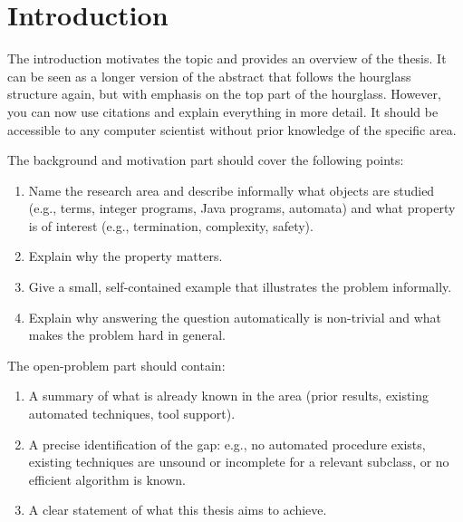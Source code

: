 \chapter{Introduction}

The introduction motivates the topic and provides an overview of the thesis.
It can be seen as a longer version of the abstract that follows the hourglass 
structure again, but with emphasis on the top part of the hourglass.
However, you can now use citations and explain everything in more detail.
It should be accessible to any computer scientist without prior knowledge of 
the specific area.


The background and motivation part should cover the following points:
\begin{enumerate}
    \item Name the research area and describe informally what objects are
          studied (e.g., terms, integer programs, Java programs, automata) and
          what property is of interest (e.g., termination, complexity, safety).
    \item Explain why the property matters.
    \item Give a small, self-contained example that illustrates the problem informally.
    \item Explain why answering the question automatically is non-trivial and
          what makes the problem hard in general.
\end{enumerate}


The open-problem part should contain:
\begin{enumerate}
    \item A summary of what is already known in the area (prior results,
          existing automated techniques, tool support).
    \item A precise identification of the gap: e.g., no automated procedure
          exists, existing techniques are unsound or incomplete for a relevant
          subclass, or no efficient algorithm is known.
    \item A clear statement of what this thesis aims to achieve.
\end{enumerate}

